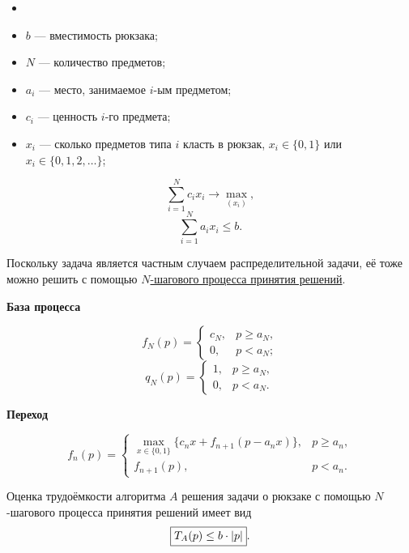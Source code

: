\mathmodel

\begin{itemize}[nosep]
	\item[]
	
	\item $b$ --- вместимость рюкзака;
	
	\item $N$ --- количество предметов;
	
	\item $a_i$ --- место, занимаемое $i$-ым предметом;
	
	\item $c_i$ --- ценность $i$-го предмета;
	
	\item $x_i$ --- сколько предметов типа $i$ класть в рюкзак, $x_i \in \{0, 1\}$ или $x_i \in \{0, 1, 2, \dots\}$;
\end{itemize}

\[
\sum_{i=1}^N c_i x_i \to \max_{(x_i)},
\]
\[
\sum_{i=1}^N a_i x_i \le b.
\]


Поскольку задача является частным случаем распределительной задачи, её тоже можно решить с помощью \hyperref[alg:n_step_process]{$N$-шагового процесса принятия решений}.

\bigskip

\textbf{База процесса}

\[
f_N(p) = \begin{cases}
	c_N,& p \ge a_N, \\
	0,& p < a_N;
\end{cases}
\]
\[
q_N(p) = \begin{cases}
	1,& p \ge a_N, \\
	0,& p < a_N.
\end{cases}
\]

\bigskip

\textbf{Переход}

\[
f_n(p) = \begin{cases}
	\max\limits_{x \in \{0, 1\}} \{c_n x + f_{n+1}(p - a_n x)\},& p \ge a_n, \\
	f_{n+1}(p),& p < a_n.
\end{cases}
\]

\fact

Оценка трудоёмкости алгоритма $A$ решения задачи о рюкзаке с помощью $N$-шагового процесса принятия решений имеет вид
\[
\boxed{T_A(p) \le b \cdot \abs{p}}.
\]

\remark

